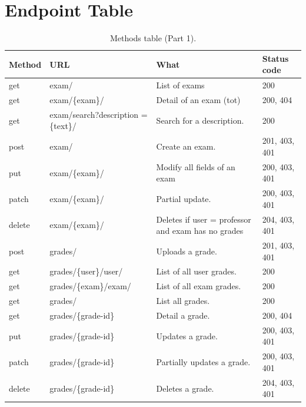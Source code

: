 \documentclass[11pt]{article}
\begin{document}
\section{Endpoint Table}
\begin{table}[h!]
\caption{Methods table (Part 1).}
\centering
\begin{tabular}{lp{4cm}p{5.5cm}l}
\hline
Method & URL & What & Status code\\
\hline
get & exam/ & List of exams & 200\\
get & exam/\{exam\}/ & Detail of an exam (tot) & 200, 404\\
get & exam/search?description =\{text\}/ & Search for a description. & 200\\
post & exam/ & Create an exam. & 201, 403, 401\\
put & exam/\{exam\}/ & Modify  all fields of an exam & 200, 403, 401\\
patch & exam/\{exam\}/ & Partial update. & 200, 403, 401\\
delete & exam/\{exam\}/ & Deletes if user = professor and exam has no grades & 204, 403, 401\\
\hline
post & grades/ & Uploads a grade. & 201, 403, 401\\
get & grades/\{user\}/user/ & List of all user grades. & 200\\
get & grades/\{exam\}/exam/ & List of all exam grades. & 200\\
get & grades/ & List all grades. & 200\\
get & grades/\{grade-id\} & Detail a grade. & 200, 404\\
put & grades/\{grade-id\} & Updates a grade. & 200, 403, 401\\
patch & grades/\{grade-id\} & Partially updates a grade. & 200, 403, 401\\
delete & grades/\{grade-id\} & Deletes a grade. & 204, 403, 401\\
\hline
\end{tabular}
\end{table}
\end{document}
